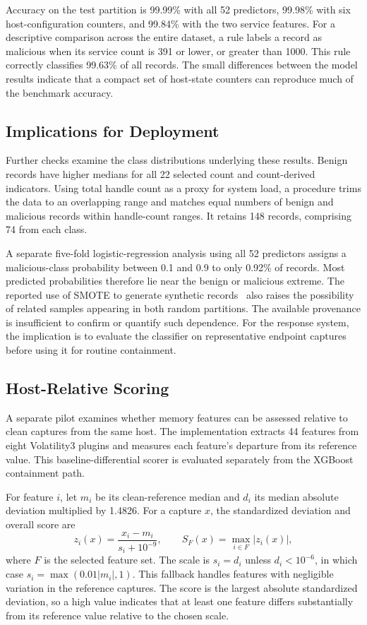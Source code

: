 \documentclass[conference]{IEEEtran}
\begin{document}
Accuracy on the test partition is 99.99\% with all 52 predictors, 99.98\%
with six host-configuration counters, and 99.84\% with the two service
features. For a descriptive comparison across the entire dataset, a rule
labels a record as malicious when its service count is 391 or lower, or
greater than 1000. This rule correctly classifies 99.63\% of all records.
The small differences between the model results indicate that a compact
set of host-state counters can reproduce much of the benchmark accuracy.

\subsection{Implications for Deployment}
Further checks examine the class distributions underlying these results.
Benign records have higher medians for all 22 selected count and count-derived
indicators. Using total handle count as a proxy for system load, a procedure
trims the data to an overlapping range and matches equal numbers of benign
and malicious records within handle-count ranges. It retains 148 records,
comprising 74 from each class.

A separate five-fold logistic-regression analysis using all 52 predictors
assigns a malicious-class probability between 0.1 and 0.9 to only 0.92\% of
records. Most predicted probabilities therefore lie near the benign or
malicious extreme. 
The reported use of SMOTE to generate synthetic records~\cite{carrier2022} also raises
the possibility of related samples appearing in both random partitions.
The available provenance is insufficient to confirm or quantify such dependence.
For the response system, the implication is to evaluate the classifier on
representative endpoint captures before using it for routine containment.

\subsection{Host-Relative Scoring}
A separate pilot examines whether memory features can be assessed relative
to clean captures from the same host. The implementation extracts 44 features
from eight Volatility3 plugins and measures each feature's departure from
its reference value. This baseline-differential scorer is evaluated
separately from the XGBoost containment path.

For feature $i$, let $m_i$ be its clean-reference median and $d_i$ its median
absolute deviation multiplied by 1.4826. For a capture $x$, the standardized
deviation and overall score are
\begin{equation}
z_i(x)=\frac{x_i-m_i}{s_i+10^{-9}},\qquad
S_F(x)=\max_{i\in F}|z_i(x)|,
\end{equation}
where $F$ is the selected feature set. The scale is $s_i=d_i$ unless
$d_i<10^{-6}$, in which case $s_i=\max(0.01|m_i|,1)$. This fallback handles
features with negligible variation in the reference captures. The score is
the largest absolute standardized deviation, so a high value indicates that
at least one feature differs substantially from its reference value relative
to the chosen scale.
\end{document}
